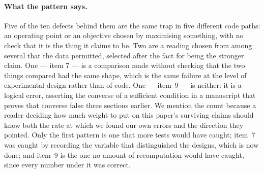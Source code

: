\paragraph{What the pattern says.} Five of the ten defects behind them are the same trap in five different code paths:
an operating point or an objective chosen by maximising something, with no check that it is the thing
it claims to be. Two are a reading chosen from among several that the data permitted, selected after
the fact for being the stronger claim. One --- item 7 --- is a comparison made without checking that
the two things compared had the same shape, which is the same failure at the level of experimental
design rather than of code. One --- item~9 --- is neither: it is a logical error, asserting the
converse of a sufficient condition in a manuscript that proves that converse false three sections
earlier. We mention the count because a reader deciding how much weight to put on
this paper's surviving claims should know both the rate at which we found our own errors and the
direction they pointed. Only the first pattern is one that more tests would have caught; item~7 was
caught by recording the variable that distinguished the designs, which is now done; and item~9 is
the one no amount of recomputation would have caught, since every number under it was correct.
